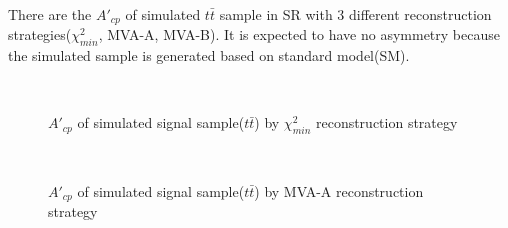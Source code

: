		There are the $A'_{cp}$ of simulated $t\bar{t}$ sample in SR with 3 different reconstruction strategies($\chi^2_{min}$, MVA-A, MVA-B). It is expected to have no asymmetry because the simulated sample is generated based on standard model(SM).


		\begin{figure}[H]
			\centering
				\\
		\caption{$A'_{cp}$ of simulated signal sample($t\bar{t}$) by $\chi^2_{min}$ reconstruction strategy}
		\label{AsymBias:fig:chi2_sim_tt_A'cp}
		\end{figure}
		\FloatBarrier

		\begin{figure}[H]
			\centering
				\\
		\caption{$A'_{cp}$ of simulated signal sample($t\bar{t}$) by MVA-A reconstruction strategy}
		\label{AsymBias:fig:a05_Mlbcut_sim_tt_A'cp}
		\end{figure}
		\FloatBarrier

